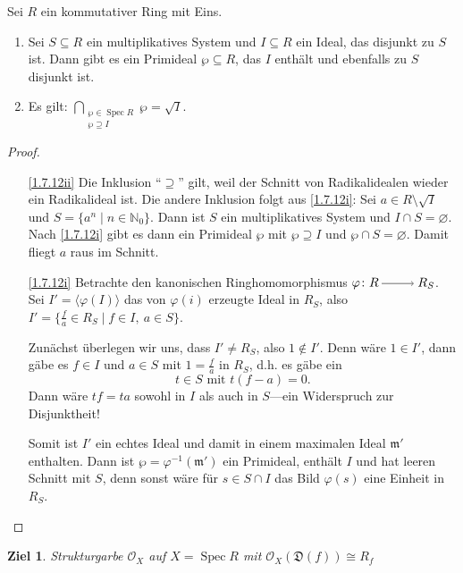 \documentclass[a4paper,12pt]{scrbook}
\theoremstyle{keinenummern} %
\newtheorem{ziel}{Ziel}
\theoremstyle{mitnummern}
\theoremstyle{unserbeweis}
\newtheorem{proof}{Beweis}
\def\O{\mathcal{O}}
\newcommand{\D}{\mathfrak{D}}
\def\m{\mathfrak{m}}
\newcommand{\Spec}{\operatorname{Spec}}
\renewcommand{\phi}{\varphi}
\newcommand{\leer}{\ensuremath{\varnothing}}
\newcommand{\set}[1]{\ensuremath{\mathbb{#1}}}
\newcommand{\N}{\set{N}}
\newcommand{\ra}{\raisebox{-1pt}{\tikz{\draw[thin,shorten >=3pt, ->] (0,0) node{\hspace*{-2pt}} -- node{} (1,0);}}\penalty1000\relax}
\begin{document}
\begin{lem}\label{1.7.12}
  Sei $R$ ein kommutativer Ring mit Eins.
  \begin{enumerate}
  \item{} Sei $S\subseteq R$ ein multiplikatives System und $I\subseteq R$ ein Ideal, das disjunkt zu $S$ ist. Dann
    gibt es ein Primideal $\wp\subseteq R$, das $I$ enthält und ebenfalls zu $S$ disjunkt ist.
  \item{} Es gilt: $\displaystyle\!\!\!\bigcap_{\substack{\wp\in\Spec R\\\wp\supseteq I}}\!\!\!\wp = \sqrt{I}$.
  \end{enumerate}
\end{lem}
\begin{proof}
  \begin{enumerate}
  \item[\ref{1.7.12ii}] Die Inklusion \enquote{$\supseteq$} gilt, weil der Schnitt von Radikalidealen wieder ein Radikalideal
    ist. Die andere Inklusion folgt aus \ref{1.7.12i}: Sei $a\in R\setminus\sqrt{I}$ und $S=\{a^n\mid n\in\N_0\}$. Dann ist $S$
    ein multiplikatives System und $I\cap S=\leer$. Nach \ref{1.7.12i} gibt es dann ein Primideal $\wp$ mit $\wp\supseteq I$ und
    $\wp\cap S=\leer$. Damit fliegt $a$ raus im Schnitt.
  \item[\ref{1.7.12i}] Betrachte den kanonischen Ringhomomorphismus $\phi\colon R\ra R_S$. Sei $I'=\langle\phi(I)\rangle$ das von $\phi(i)$
    erzeugte Ideal in $R_S$, also $I'=\{\frac{f}{a}\in R_S\mid f\in I,\ a\in S\}$.

    Zunächst überlegen wir uns, dass $I'\neq R_S$, also $1\notin I'$. Denn wäre $1\in I'$, dann gäbe es $f\in I$ und $a\in S$
    mit $1=\frac{f}{a}$ in $R_S$, d.h. es gäbe ein
    \[t\in S\text{ mit }t(f-a)=0.\] 
    Dann wäre $tf=ta$ sowohl in $I$ als auch in $S$---ein Widerspruch zur Disjunktheit!

    Somit ist $I'$ ein echtes Ideal und damit in einem maximalen Ideal $\m'$ enthalten. Dann ist $\wp=\phi^{-1}(\m')$ ein
    Primideal, enthält $I$ und hat leeren Schnitt mit $S$, denn sonst wäre für $s\in S\cap I$ das Bild $\phi(s)$ eine Einheit in
    $R_S$.
  \end{enumerate}
\end{proof}

\begin{ziel}
  Strukturgarbe $\O_X$ auf $X=\Spec R$ mit $\O_X(\D(f))\cong R_f$
\end{ziel}
\end{document}
